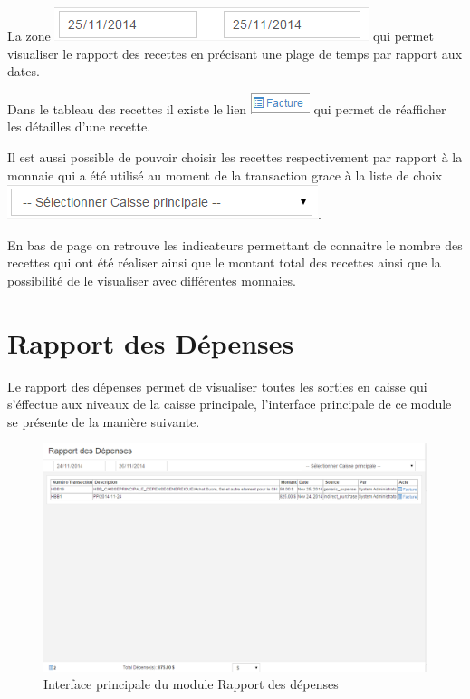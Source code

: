 \documentclass[12pt,a4paper]{report}
\begin{document}
La zone  \includegraphics[scale=0.7]{pic/PlageTimes.png} qui permet visualiser le rapport des recettes en précisant une plage de temps par rapport aux dates.

Dans le tableau des recettes il existe le lien \includegraphics[scale=0.7]{pic/FactureRePrint.png} qui permet de réafficher les détailles d'une recette.

Il est aussi possible de pouvoir choisir les recettes respectivement par rapport à la monnaie qui a été utilisé au moment de la transaction grace à la liste de choix \includegraphics[scale=0.7]{pic/SelecPriCash.png}.

En bas de page on retrouve les indicateurs permettant de connaitre le nombre des recettes qui ont été réaliser ainsi que le montant total des recettes ainsi que la possibilité de le visualiser avec différentes monnaies. 

\newpage
\section{Rapport des Dépenses}
Le rapport des dépenses permet de visualiser toutes les sorties en caisse qui s'éffectue aux niveaux de la caisse principale, l'interface principale de ce module se présente de la manière suivante.

\begin{figure}[h]
\begin{center}
\includegraphics[width=14cm]{pic/RapDepenses.png}
\end{center}
\caption{Interface principale du module Rapport des dépenses}
\label{Interface principale du module Rapport des dépenses}
\end{figure}
\end{document}
